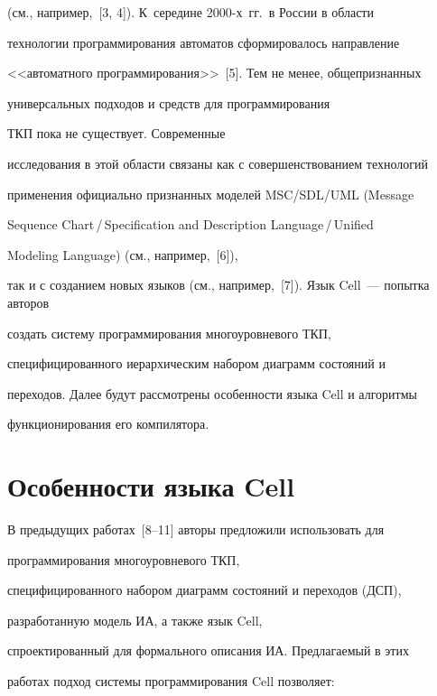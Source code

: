 (см., например,~[3, 4]). К~середине 2000-х~гг.\ в России в области 


технологии программирования автоматов сформировалось направление 


<<автоматного программирования>>~[5]. Тем не менее, общепризнанных 


универсальных подходов и средств для программирования 


ТКП пока не существует. Современные 


исследования в этой области связаны как с совершенствованием технологий 


применения официально признанных моделей MSC/SDL/UML (Message


Sequence Chart\,/\,Specification and Description Language\,/\,Unified


Modeling Language) (см., например,~[6]), 


так и с созданием новых языков (см., например,~[7]). Язык Cell~--- попытка авторов 


создать систему программирования многоуровневого ТКП, 


специфицированного иерархическим набором диаграмм состояний и 


переходов. Далее будут рас\-смот\-ре\-ны особенности языка Cell и алгоритмы 


функционирования его компилятора.





\section{Особенности языка Cell}


 


      В предыдущих работах~[8--11] авторы предложили использовать для 


программирования многоуровневого ТКП, 


специфицированного набором диаграмм состояний и переходов (ДСП), 


разработанную модель ИА, а также язык Cell, 


спроектированный для формального описания ИА. Предлагаемый в этих 


работах подход системы программирования Cell позволяет:


